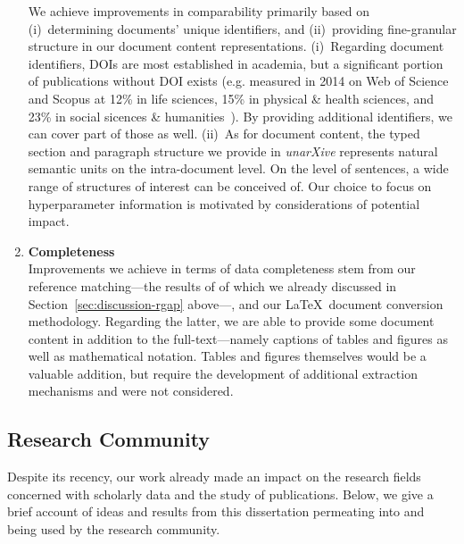 \begin{enumerate}
We achieve improvements in comparability primarily based on (i)~determining documents' unique identifiers, and (ii)~providing fine-granular structure in our document content representations. (i)~Regarding document identifiers, DOIs are most established in academia, but a significant portion of publications without DOI exists (e.g. 
measured in 2014 on Web of Science and Scopus at 12\% in life sciences, 15\% in physical \& health sciences, and 23\% in social sicences \& humanities~\cite{Gorraiz2016}).
By providing additional identifiers, we can cover part of those as well. (ii)~As for document content, the typed section and paragraph structure we provide in \textit{unarXive} represents natural semantic units on the intra-document level. On the level of sentences, a wide range of structures of interest can be conceived of. Our choice to focus on hyperparameter information is motivated by considerations of potential impact.
\item \textbf{Completeness}\\
Improvements we achieve in terms of data completeness stem from our reference matching---the results of of which we already discussed in Section~\ref{sec:discussion-rgap} above---, and our \LaTeX\ document conversion methodology. Regarding the latter, we are able to provide some document content in addition to the full-text---namely captions of tables and figures as well as mathematical notation. Tables and figures themselves would be a valuable addition, but require the development of additional extraction mechanisms and were not considered. %
\end{enumerate}

\subsection{Research Community}
Despite its recency, our work already made an impact on the research fields concerned with scholarly data and the study of publications. Below, we give a brief account of ideas and results from this dissertation permeating into and being used by the research community.

